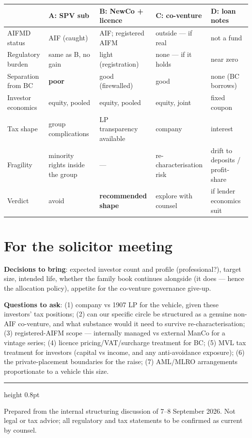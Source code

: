 \documentclass[11pt,a4paper]{article}
\begin{document}
\begin{center}
\footnotesize
\begin{tabular}{@{}p{2.5cm}p{2.9cm}p{3.1cm}p{3.0cm}p{2.9cm}@{}}
\toprule
 & \textbf{A: SPV sub} & \textbf{B: NewCo + licence} & \textbf{C: co-venture} & \textbf{D: loan notes} \\
\midrule
AIFMD status      & AIF (caught)          & AIF; registered AIFM      & outside --- if real       & not a fund \\
Regulatory burden & same as B, no gain    & light (registration)      & none --- if it holds      & near zero \\
Separation from BC & \textbf{poor}        & good (firewalled)         & good                      & none (BC borrows) \\
Investor economics & equity, pooled       & equity, pooled            & equity, joint             & fixed coupon \\
Tax shape         & group complications   & LP transparency available & company                   & interest \\
Fragility         & minority rights inside the group & ---            & re-characterisation risk  & drift to deposits / profit-share \\
Verdict           & {\color{bcred}avoid}  & {\color{bcteal}\textbf{recommended shape}} & explore with counsel & if lender economics suit \\
\bottomrule
\end{tabular}
\end{center}

\section{For the solicitor meeting}

\textbf{Decisions to bring}: expected investor count and profile
(professional?), target size, intended life, whether the family book
continues alongside (it does --- hence the allocation policy), appetite for
the co-venture governance give-up.

\textbf{Questions to ask}: (1) company vs 1907 LP for the vehicle, given
these investors' tax positions; (2) can our specific circle be structured as
a genuine non-AIF co-venture, and what substance would it need to survive
re-characterisation; (3) registered-AIFM scope --- internally managed vs
external ManCo for a vintage series; (4) licence pricing/VAT/surcharge
treatment for BC; (5) MVL tax treatment for investors (capital vs income,
and any anti-avoidance exposure); (6) the private-placement boundaries for
the raise; (7) AML/MLRO arrangements proportionate to a vehicle this size.

\vspace{0.4cm}
{\color{bcnavy}\hrule height 0.8pt}
\vspace{0.2cm}
{\footnotesize\color{bcgrey} Prepared from the internal structuring
discussion of 7--8 September 2026. Not legal or tax advice; all regulatory
and tax statements to be confirmed as current by counsel.}
\end{document}
